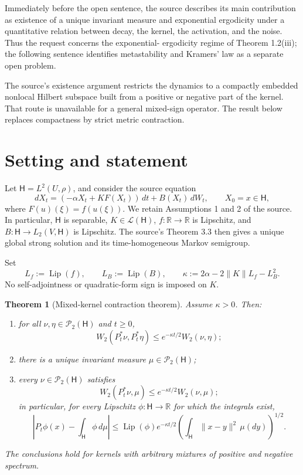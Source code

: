 \documentclass[11pt]{article}
\newtheorem{theorem}{Theorem}
\newcommand{\HH}{\mathsf H}
\newcommand{\PP}{\mathcal P_2}
\newcommand{\Wtwo}{W_2}
\newcommand{\Lip}{\operatorname{Lip}}
\begin{document}
Immediately before the open sentence, the source describes its main
contribution as existence of a unique invariant measure and exponential
ergodicity under a quantitative relation between decay, the kernel, the
activation, and the noise.  Thus the request concerns the exponential-
ergodicity regime of Theorem 1.2(iii); the following sentence identifies
metastability and Kramers' law as a separate open problem.

The source's existence argument restricts the dynamics to a compactly embedded
nonlocal Hilbert subspace built from a positive or negative part of the kernel.
That route is unavailable for a general mixed-sign operator.  The result below
replaces compactness by strict metric contraction.

\section{Setting and statement}

Let \(\HH=L^2(U,\rho)\), and consider the source equation
\begin{equation}\label{eq:sde}
 dX_t=(-\alpha X_t+K F(X_t))\,dt+B(X_t)\,dW_t,
 \qquad X_0=x\in\HH,
\end{equation}
where \(F(u)(\xi)=f(u(\xi))\).  We retain Assumptions 1 and 2 of
the source.  In particular, \(\HH\) is separable, \(K\in\mathcal L(\HH)\),
\(f:\mathbb R\to\mathbb R\) is Lipschitz, and
\(B:\HH\to L_2(V,\HH)\) is Lipschitz.  The source's Theorem 3.3 then gives a
unique global strong solution and its time-homogeneous Markov semigroup.

Set
\[
 L_f:=\Lip(f),\qquad L_B:=\Lip(B),\qquad
 \kappa:=2\alpha-2\lVert K\rVert L_f-L_B^2.
\]
No self-adjointness or quadratic-form sign is imposed on \(K\).

\begin{theorem}[Mixed-kernel contraction theorem]\label{thm:main}
Assume \(\kappa>0\).  Then:
\begin{enumerate}
\item for all \(\nu,\eta\in\PP(\HH)\) and \(t\ge0\),
\begin{equation}\label{eq:contraction}
 \Wtwo(P_t^*\nu,P_t^*\eta)
 \le e^{-\kappa t/2}\Wtwo(\nu,\eta);
\end{equation}
\item there is a unique invariant measure \(\mu\in\PP(\HH)\);
\item every \(\nu\in\PP(\HH)\) satisfies
\begin{equation}\label{eq:conv}
 \Wtwo(P_t^*\nu,\mu)
 \le e^{-\kappa t/2}\Wtwo(\nu,\mu);
\end{equation}
in particular, for every Lipschitz \(\phi:\HH\to\mathbb R\) for which the
integrals exist,
\[
 \left|P_t\phi(x)-\int_{\HH}\phi\,d\mu\right|
 \le \Lip(\phi)e^{-\kappa t/2}
 \left(\int_{\HH}\lVert x-y\rVert^2\,\mu(dy)\right)^{1/2}.
\]
\end{enumerate}
The conclusions hold for kernels with arbitrary mixtures of positive and
negative spectrum.
\end{theorem}
\end{document}
